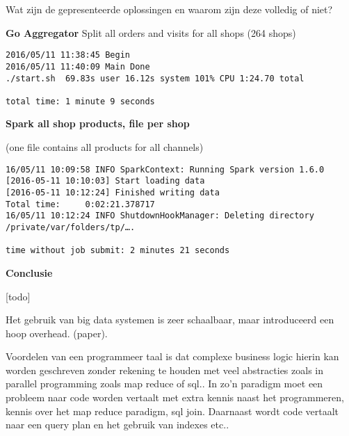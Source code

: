 Wat zijn de gepresenteerde oplossingen en waarom zijn deze volledig of niet?

\textbf{Go Aggregator}
Split all orders and visits for all shops (264 shops)

\begin{lstlisting}
2016/05/11 11:38:45 Begin
2016/05/11 11:40:09 Main Done
./start.sh  69.83s user 16.12s system 101% CPU 1:24.70 total

total time: 1 minute 9 seconds
\end{lstlisting}

\textbf{Spark all shop products, file per shop}

(one file contains all products for all channels)

\begin{lstlisting}
16/05/11 10:09:58 INFO SparkContext: Running Spark version 1.6.0
[2016-05-11 10:10:03] Start loading data
[2016-05-11 10:12:24] Finished writing data
Total time:     0:02:21.378717
16/05/11 10:12:24 INFO ShutdownHookManager: Deleting directory /private/var/folders/tp/….

time without job submit: 2 minutes 21 seconds
\end{lstlisting}


\textbf{Conclusie}

[todo]

Het gebruik van big data systemen is zeer schaalbaar, maar introduceerd een hoop overhead. (paper).

Voordelen van een programmeer taal is dat complexe business logic hierin kan worden geschreven zonder rekening te houden met veel abstracties zoals in parallel programming zoals map reduce of sql.. In zo'n paradigm moet een probleem naar code worden vertaalt met extra kennis naast het programmeren, kennis over het map reduce paradigm, sql join. Daarnaast wordt code vertaalt naar een query plan en het gebruik van indexes etc..

